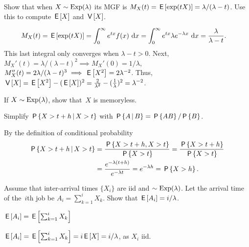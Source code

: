 \documentclass[queueing-book.tex]{subfiles}
\begin{document}
\begin{exercise}\label{ex:11}
Show that when $X\sim \mathrm{Exp}(\lambda)$ its MGF is $ M_X(t) = \,\mathsf{E}\left[\exp(t X)\right] = \lambda/(\lambda -t)$. Use this to compute $\,\mathsf{E}\left[X\right]$ and $\,\mathsf{V}\left[X\right]$.
\begin{solution}
 \begin{align*}
 M_X(t) &= \,\mathsf{E}\left[\exp(t X)\right]
=\int_0^\infty e^{tx} f(x) \,\,\textrm{d}x
=\int_0^\infty e^{tx} \lambda e^{-\lambda x} \,\,\textrm{d}x =\frac{\lambda}{\lambda -t}.
 \end{align*}
This last integral only converges when $\lambda -t > 0$. Next, $M_X'(t)=\lambda/(\lambda-t)^2 \implies M_X'(0)=1/\lambda$, $M_X''(t)=2\lambda/(\lambda-t)^3 \implies \,\mathsf{E}\left[X^2\right]=2\lambda^{-2}$.
Thus, $\,\mathsf{V}\left[X\right] = \,\mathsf{E}\left[X^2\right] - (\,\mathsf{E}\left[X\right])^2 = \frac{2}{\lambda^2} - (\frac{1}{\lambda})^2 = \lambda^{-2}$.
\end{solution}
\end{exercise}


\begin{exercise}\label{ex:l-214}
If $X\sim \mathrm{Exp}(\lambda)$, show that~$X$ is memoryless.
\begin{hint}
Simplify $\,\mathsf{P}\left\{X>t+h\,\middle|\, X>t\right\}$ with $\,\mathsf{P}\left\{A\,\middle|\, B\right\} = \,\mathsf{P}\left\{AB\right\}/\,\mathsf{P}\left\{B\right\}$.
\end{hint}
\begin{solution}
By the definition of conditional probability
\begin{equation*}
  \begin{split}
 \,\mathsf{P}\left\{X>t+h\,\middle|\, X>t\right\} &= \frac{\,\mathsf{P}\left\{X>t+h, X>t\right\}}{\,\mathsf{P}\left\{X>t\right\}} = \frac{\,\mathsf{P}\left\{X>t+h\right\}}{\,\mathsf{P}\left\{X>t\right\}} \\
&= \frac{e^{-\lambda(t+h)}}{e^{-\lambda t}} = e^{-\lambda h} = \,\mathsf{P}\left\{X>h\right\}.
  \end{split}
\end{equation*}
\end{solution}
\end{exercise}


\begin{exercise}\label{ex:30}
 Assume  that inter-arrival times $\{X_i\}$ are iid and $\sim\mathrm{Exp}(\lambda)$. Let
the arrival time of the~$i$th job be $A_i=\sum_{k=1}^i X_k$. Show that
$\,\mathsf{E}\left[A_i\right] = i/\lambda$.
\begin{hint}
$\,\mathsf{E}\left[A_i\right] = \,\mathsf{E}\left[\sum_{k=1}^i X_k\right]$
\end{hint}
\begin{solution}
$\,\mathsf{E}\left[A_i\right] = \,\mathsf{E}\left[\sum_{k=1}^i X_k\right] = i \,\mathsf{E}\left[X\right] =  i/ \lambda$, as $X_i$ iid.
\end{solution}
\end{exercise}
\end{document}
